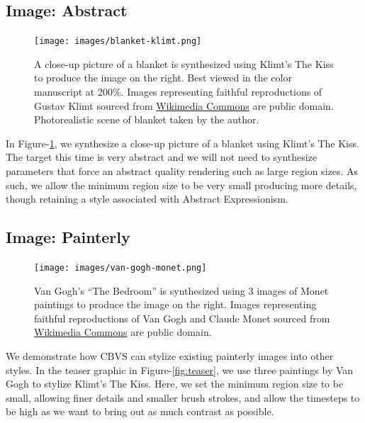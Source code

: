 \documentclass[a4paper,11pt,final]{ThesisStyle}
\begin{document}
\subsection{Image: Abstract}\vspace{-0.4em}
\begin{figure}[ht]
  \centering
  \texttt{[image: images/blanket-klimt.png]}
  \caption{A close-up picture of a blanket is synthesized using Klimt's The Kiss to produce the image on the right. Best viewed in the color manuscript at 200\%. Images representing faithful reproductions of Gustav Klimt sourced from \href{http://commons.wikimedia.org}{Wikimedia Commons} are public domain.  Photorealistic scene of blanket taken by the author.}
  \label{fig:blanket-klimt}
\end{figure}
In Figure-\ref{fig:blanket-klimt}, we synthesize a close-up picture of a blanket using Klimt's The Kiss.  The target this time is very abstract and we will not need to synthesize parameters that force an abstract quality rendering such as large region sizes.  As such, we allow the minimum region size to be very small producing more details, though retaining a style associated with Abstract Expressionism.
\subsection{Image: Painterly}\vspace{-0.4em}
\begin{figure}[ht]
  \centering
  \texttt{[image: images/van-gogh-monet.png]}
  \caption{Van Gogh's ``The Bedroom'' is synthesized using 3 images of Monet paintings to produce the image on the right. Images representing faithful reproductions of Van Gogh and Claude Monet sourced from \href{http://commons.wikimedia.org}{Wikimedia Commons} are public domain.}
  \label{fig:van-gogh-monet}
\end{figure}
We demonstrate how CBVS can stylize existing painterly images into other styles.  In the teaser graphic in Figure-\ref{fig:teaser}, we use three paintings by Van Gogh to stylize Klimt's The Kiss.  Here, we set the minimum region size to be small, allowing finer details and smaller brush strokes, and allow the timesteps to be high as we want to bring out as much contrast as possible.  
\end{document}
